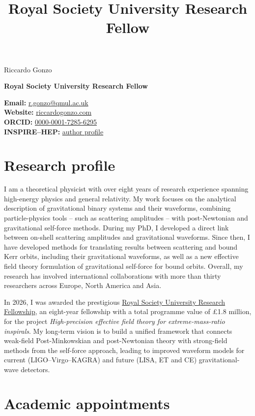 \documentclass[11pt,a4paper,sans]{moderncv}
\title{Royal Society University Research Fellow}
\makeatletter
\newcommand{\cvheader}{%
  \noindent
  \begin{minipage}[t]{0.59\textwidth}
    \vspace{0pt}%
    {\fontsize{31}{33}\selectfont\color{CVInk}Riccardo Gonzo}\par
    \vspace{0.22em}%
    {\fontsize{12}{14}\selectfont\bfseries\color{CVOchre}Royal Society University Research Fellow}
  \end{minipage}\hfill
  \begin{minipage}[t]{0.38\textwidth}
    \vspace{0pt}%
    \raggedleft\fontsize{9.2}{11.2}\selectfont
    \textbf{Email:} \href{mailto:r.gonzo@qmul.ac.uk}{r.gonzo@qmul.ac.uk}\\
    \textbf{Website:} \href{https://riccardogonzo.com}{riccardogonzo.com}\\
    \textbf{ORCID:} \href{https://orcid.org/0000-0001-7285-6295}{0000-0001-7285-6295}\\
    \textbf{INSPIRE--HEP:} \href{https://inspirehep.net/authors/1812058?ui-citation-summary=true}{author profile}
  \end{minipage}%
  \par\vspace{0.78em}%
}
\makeatother
\begin{document}
\cvheader
\thispagestyle{cvfooter}

\section{Research profile}
I am a theoretical physicist with over eight years of research experience spanning high-energy physics and general relativity. My work focuses on the analytical description of gravitational binary systems and their waveforms, combining particle-physics tools -- such as scattering amplitudes -- with post-Newtonian and gravitational self-force methods. During my PhD, I developed a direct link between on-shell scattering amplitudes and gravitational waveforms. Since then, I have developed methods for translating results between scattering and bound Kerr orbits, including their gravitational waveforms, as well as a new effective field theory formulation of gravitational self-force for bound orbits. Overall, my research has involved international collaborations with more than thirty researchers across Europe, North America and Asia. 

In 2026, I was awarded the prestigious \href{https://royalsociety.org/grants/university-research/}{Royal Society University Research Fellowship}, an eight-year fellowship with a total programme value of \pounds{}1.8 million, for the project \emph{High-precision effective field theory for extreme-mass-ratio inspirals}. My long-term vision is to build a unified framework that connects weak-field Post-Minkowskian and post-Newtonian theory with strong-field methods from the self-force approach, leading to improved waveform models for current (LIGO--Virgo--KAGRA) and future (LISA, ET and CE) gravitational-wave detectors.

\section{Academic appointments}
\end{document}
